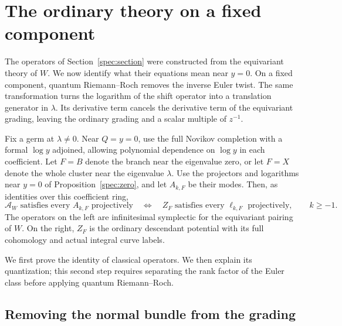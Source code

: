 \section{The ordinary theory on a fixed component}
\label{fixed:section}

The operators of Section~\ref{spec:section} were constructed from the
equivariant theory of $W$.  We now identify what their equations mean near
$y=0$.  On a fixed component, quantum Riemann--Roch removes the inverse
Euler twist.  The same transformation turns the logarithm of the shift
operator into a translation generator in $\lambda$.  Its derivative term
cancels the derivative term of the equivariant grading, leaving the
ordinary grading and a scalar multiple of $z^{-1}$.

\begin{proposition}\label{fixed:equivalence}
Fix a germ at $\lambda\ne0$.  Near $Q=y=0$, use the full Novikov
completion with a formal $\log y$ adjoined, allowing polynomial
dependence on $\log y$ in each coefficient.
Let $F=B$ denote the branch near the eigenvalue zero, or let $F=X$ denote
the whole cluster near the eigenvalue $\lambda$.  Use the projectors and
logarithms near $y=0$ of Proposition~\ref{spec:zero}, and let $A_{k,F}$ be
their modes.  Then, as identities over this coefficient ring,
\[
 \mathcal A_W\text{ satisfies every }A_{k,F}\text{ projectively}
 \quad\Longleftrightarrow\quad
 Z_F\text{ satisfies every }\ell_{k,F}\text{ projectively},
 \qquad k\geq-1.
\]
The operators on the left are infinitesimal symplectic for the equivariant
pairing of $W$.  On the right, $Z_F$ is the ordinary descendant potential
with its full cohomology and actual integral curve labels.
\end{proposition}

We first prove the identity of classical operators.  We then explain its
quantization; this second step requires separating the rank factor of the
Euler class before applying quantum Riemann--Roch.

\subsection{Removing the normal bundle from the grading}

